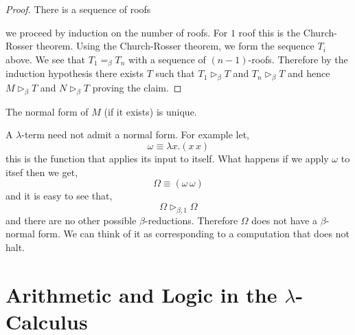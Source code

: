 \documentclass[12pt]{article}
\newcommand{\red}{\triangleright}
\newcommand{\bredo}{\red_{\beta,1}}
\newcommand{\bred}{\red_{\beta}}
\begin{document}
\begin{proof}
There is a sequence of roofs
\begin{center}
\end{center}
we proceed by induction on the number of roofs. For $1$ roof this is the Church-Rosser theorem. Using the Church-Rosser theorem, we form the sequence $T_i$ above. We see that $T_1 =_{\beta} T_n$ with a sequence of $(n-1)$-roofs. Therefore by the induction hypothesis there exists $T$ such that $T_1 \bred T$ and $T_n \bred T$ and hence $M \bred T$ and $N \bred T$ proving the claim.
\end{proof}

\begin{cor}
The normal form of $M$ (if it exists) is unique.
\end{cor}

\begin{example}
A $\lambda$-term need not admit a normal form. For example let,
\[ \omega \equiv \lambda x . (x \, x) \]
this is the function that applies its input to itself. What happens if we apply $\omega$ to itsef then we get,
\[ \Omega \equiv (\omega \, \omega) \]
and it is easy to see that,
\[ \Omega \bredo \Omega \]
and there are no other possible $\beta$-reductions. Therefore $\Omega$ does not have a $\beta$-normal form. We can think of it as corresponding to a computation that does not halt.
\end{example}

\section{Arithmetic and Logic in the $\lambda$-Calculus}
\end{document}
